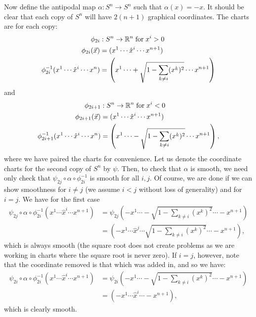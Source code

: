 \documentclass{../../mathnotes}
\begin{document}
Now define the antipodal map $\alpha:S^n\to S^n$ such that $\alpha(x)=-x$. It should be clear that each copy of $S^n$ will have $2(n+1)$
graphical coordinates. The charts are for each copy:
\begin{align*}
    \phi_{2i}&:S^n\to\mathbb{R}^n \;\textnormal{for}\;x^i>0\\
    \phi_{2i}(\vec{x})&=(x^1\cdots \hat{x}^i\cdots x^{n+1})\\
    \phi_{2i}^{-1}(x^1\cdots \hat{x}^i \cdots x^n)&=\left(x^1\cdots +\sqrt{1-\sum_{k\neq i}(x^k)^2}\cdots x^{n+1}\right)
\end{align*}
and
\begin{align*}
    \phi_{2i+1}&:S^n\to\mathbb{R}^n \;\textnormal{for}\;x^i<0\\
    \phi_{2i+1}(\vec{x})&=(x^1\cdots \hat{x}^i\cdots x^{n+1})\\
    \phi_{2i+1}^{-1}(x^1\cdots \hat{x}^i \cdots x^n)&=\left(x^1\cdots -\sqrt{1-\sum_{k\neq i}(x^k)^2}\cdots x^{n+1}\right),
\end{align*}
where we have paired the charts for convenience. Let us denote the coordinate charts for the second copy of $S^n$ by $\psi$.
Then, to check that $\alpha$ is smooth, we need only check that $\psi_{2j}\circ \alpha\circ \phi_{2i}^{-1}$ is smooth for all $i,j$.
Of course, we are done if we can show smoothness for $i\neq j$ (we assume $i<j$ without loss of generality) and for $i=j$. We have for the first case
\begin{align*}
    \psi_{2j}\circ \alpha\circ \phi_{2i}^{-1}(x^1\cdots \hat{x}^i\cdots x^{n+1})&=\psi_{2j}\left(-x^1\cdots -\sqrt{1-\sum_{k\neq i}(x^k)^2}\cdots -x^{n+1}\right)\\
    &=\left( -x^1\cdots \hat{x}^j \cdots \sqrt{1-\sum_{k\neq i}(x^k)^2}\cdots -x^{n+1}\right),
\end{align*}
which is always smooth (the square root does not create problems as we are working in charts where the square root is never zero). If $i=j$, however, note
that the coordinate removed is that which was added in, and so we have:
\begin{align*}
    \psi_{2i}\circ \alpha\circ \phi_{2i}^{-1}(x^1\cdots \hat{x}^i\cdots x^{n+1})&=\psi_{2i}\left(-x^1\cdots -\sqrt{1-\sum_{k\neq i}(x^k)^2}\cdots -x^{n+1}\right)\\
    &=\left( -x^1\cdots \hat{x}^i \cdots -x^{n+1}\right),
\end{align*}
which is clearly smooth.
\end{document}
